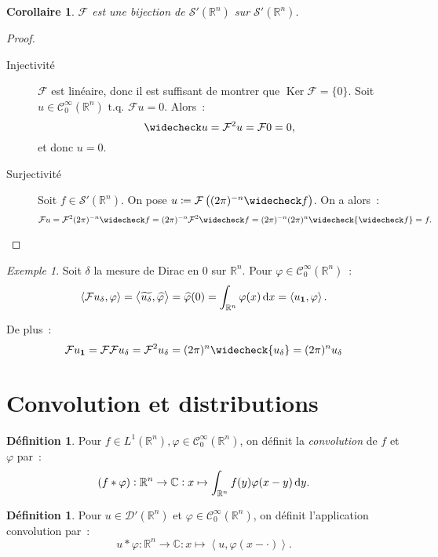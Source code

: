 \documentclass{report}
\DeclareMathOperator{\Ker}{Ker}
\newcommand{\C}{{\mathbb C}}
\newcommand{\R}{{\mathbb R}}
\newcommand{\scpr}[2]{\left\langle#1, #2\right\rangle}
\newcommand{\tq}{\text{ t.q. }}
\newcommand{\st}{\tq}
\newtheorem{cor}[thm]{Corollaire}
\theoremstyle{definition}
\newtheorem{déf}[thm]{Définition}
\theoremstyle{remark}
\newtheorem{ex}{Exemple}[chapter]
\begin{document}
\begin{cor} $\mathcal F$ est une bijection de $\mathcal S'(\R^n)$ sur $\mathcal S'(\R^n)$.
\end{cor}

\begin{proof}~
\begin{description}
	\item[Injectivité] $\mathcal F$ est linéaire, donc il est suffisant de montrer que $\Ker\mathcal F = \{0\}$. Soit $u \in \mathcal C^\infty_0(\R^n) \st \mathcal Fu = 0$. Alors~:
	\[\widecheck u = \mathcal F^2u = \mathcal F0 = 0,\]
	et donc $u = 0$.
	\item[Surjectivité] Soit $f \in \mathcal S'(\R^n)$. On pose $u \coloneqq \mathcal F\left((2\pi)^{-n}\widecheck f\right)$. On a alors~:
	\[\mathcal Fu = \mathcal F^2(2\pi)^{-n}\widecheck f = (2\pi)^{-n}\mathcal F^2\widecheck f = (2\pi)^{-n}(2\pi)^n\widecheck {\widecheck f} = f.\]
\end{description}
\end{proof}

\begin{ex} Soit $\delta$ la mesure de Dirac en 0 sur $\R^n$. Pour $\varphi \in \mathcal C^\infty_0(\R^n)$~:
\[\scpr {\mathcal Fu_\delta}\varphi = \scpr {\widetilde {u_\delta}}{\widehat \varphi} = \widehat \varphi(0) = \int_{\R^n}\varphi(x)\dif x = \scpr {u_\mathbf 1}\varphi.\]

De plus~:
\[\mathcal Fu_{\mathbf 1} = \mathcal F\mathcal Fu_\delta = \mathcal F^2u_\delta = (2\pi)^n \widecheck {u_{\delta}} = (2\pi)^n u_{\delta}\]
\end{ex}

\section{Convolution et distributions}

\begin{déf} Pour $f \in L^1(\R^n), \varphi \in \mathcal C^\infty_0(\R^n)$, on définit la \textit{convolution} de $f$ et $\varphi$ par~:
\[(f * \varphi) : \R^n \to \C : x \mapsto \int_{\R^n}f(y)\varphi(x-y)\dif y.\]
\end{déf}

\begin{déf} Pour $u \in \mathcal D'(\R^n)$ et $\varphi \in \mathcal C^\infty_0(\R^n)$, on définit l'application convolution par~:
\[u*\varphi : \R^n \to \C : x \mapsto \scpr u{\varphi(x-\cdot)}.\]
\end{déf}
\end{document}
